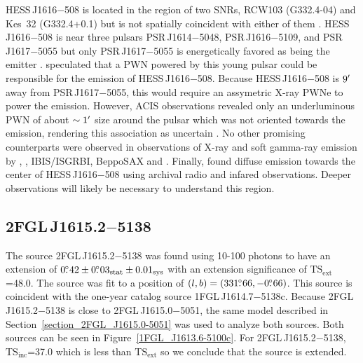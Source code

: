 \documentclass[12pt,preprint]{aastex}
\newcommand{\gev}{\text{GeV}\xspace}
\newcommand{\tev}{\text{TeV}\xspace}
\newcommand{\tsext}{{\ensuremath{\text{TS}_{\text{ext}}}}\xspace}
\newcommand{\tsinc}{\ensuremath{\text{TS}_{\text{inc}}}\xspace}
\newcommand{\chandra}{\text{{\em Chandra}}\xspace}
\newcommand{\swiftxrt}{\text{{\em Swift}/XRT}\xspace}
\newcommand{\suzaku}{\text{{\em Suzaku}}\xspace}
\newcommand{\xmmnewton}{\text{{\em XMM-Newton}}\xspace}
\newcommand{\sys}{\text{sys}\xspace}
\newcommand{\stat}{\text{stat}\xspace}
\newcommand{\hl}[1]{#1}
\begin{document}
\hl{
HESS\,J1616$-$508 is located in the region of two SNRs, RCW103
(G332.4-04) and Kes~32 (G332.4+0.1) but is not spatially coincident
with either of them \citep{hess_plane_survey}.  HESS\,J1616$-$508 is near
three pulsars PSR\,J1614$-$5048, PSR\,J1616$-$5109, and PSR\,J1617$-$5055
but only PSR\,J1617$-$5055 is energetically favored as being the \tev
emitter \citep{discovery_of_PSR_J1617-5055,integral_HESS_J1616-508}.
\cite{hess_plane_survey} speculated that a PWN powered by this young
pulsar could be responsible for the emission of HESS\,J1616$-$508.
Because HESS\,J1616$-$508 is $9\mbox{$^\prime$}$ away from PSR\,J1617$-$5055, this would
require an assymetric X-ray PWNe to power the \tev emission. However,
\chandra ACIS observations revealed only an underluminous PWN of
about $\sim1\mbox{$^\prime$}$ size around the pulsar which was not oriented
towards the \tev emission, rendering this association as uncertain
\citep{discovery_of_pwn_for_PSR_J1617-5055}.  No other promising
counterparts were observed in observations of X-ray and soft gamma-ray
emission by \suzaku \citep{suzakzu_HESS_J1616-508}, \swiftxrt,
IBIS/ISGRBI, BeppoSAX and \xmmnewton \citep{integral_HESS_J1616-508}.
Finally, \cite{discovery_of_pwn_for_PSR_J1617-5055} found diffuse
emission towards the center of HESS\,J1616$-$508 using archival radio and
infared observations.  Deeper observations will likely be necessary to
understand this region.
}

\subsection{2FGL\,J1615.2$-$5138}
\label{section_2FGL_J1615.2-5138}

The source 2FGL\,J1615.2$-$5138 was found using 10-100 \gev
photons to have an extension of $0\fdg42\pm0\fdg03_\stat\pm0.01_\sys$
with an extension significance of \tsext=48.0.  The source was fit to a
position of $(l,b)=(331\mbox{$.\!\!^\circ$}66,-0\mbox{$.\!\!^\circ$}66)$.  This source is coincident
with the one-year catalog source 1FGL\,J1614.7$-$5138c.  Because 2FGL
J1615.2$-$5138 is close to 2FGL\,J1615.0$-$5051, the same model described
in Section~\ref{section_2FGL_J1615.0-5051} was used to analyze both
sources. Both sources can be seen in Figure~\ref{1FGL_J1613.6-5100c}.
For 2FGL\,J1615.2$-$5138, \tsinc=37.0 which is less than \tsext so we
conclude that the source is extended.
\end{document}
